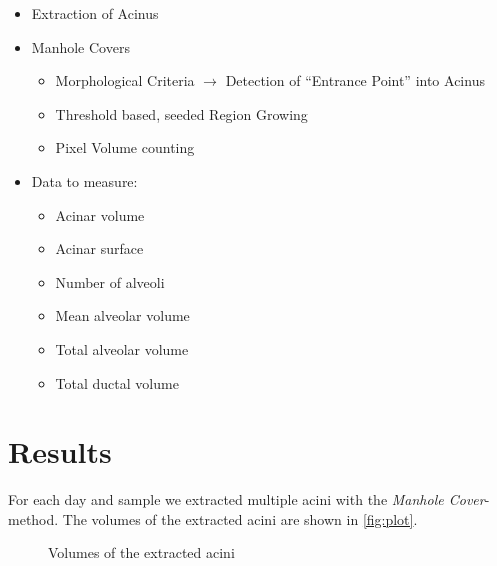 \documentclass[%
	paper=a4,%
	DIV=calc,%
	twoside=true,%
	draft=true,%
	abstract=false]{scrartcl}
\begin{document}
\begin{itemize}
	\item Extraction of Acinus
	\item Manhole Covers
	\begin{itemize}
		\item Morphological Criteria $\rightarrow$ Detection of ``Entrance Point'' into Acinus
		\item Threshold based, seeded Region Growing
		\item Pixel Volume counting
	\end{itemize}
	\item Data to measure:
	\begin{itemize}
		\item Acinar volume
		\item Acinar surface
		\item Number of alveoli
		\item Mean alveolar volume
		\item Total alveolar volume
		\item Total ductal volume
	\end{itemize}
\end{itemize}

\section{Results}\label{sec:Results}
For each day and sample we extracted multiple acini with the \emph{Manhole Cover}-method. The volumes of the extracted acini are shown in \autoref{fig:plot}.

\begin{figure}
	\centering
	\caption{Volumes of the extracted acini}
	\label{fig:plot}
\end{figure}
\end{document}
